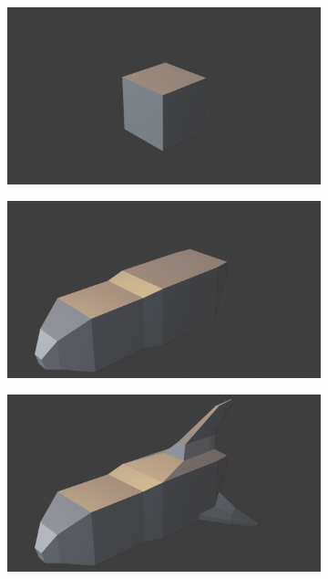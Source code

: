 \begin{figure}
\centering
\begin{subfigure}{.5\textwidth}
  \centering
  \includegraphics[width=.99\linewidth]{Figures/box1.png}
\end{subfigure}%
\begin{subfigure}{.5\textwidth}
  \centering
  \includegraphics[width=.99\linewidth]{Figures/box2.png}
\end{subfigure}
\begin{subfigure}{.5\textwidth}
  \centering
  \includegraphics[width=.99\linewidth]{Figures/box3.png}

\end{subfigure}
\end{figure}
